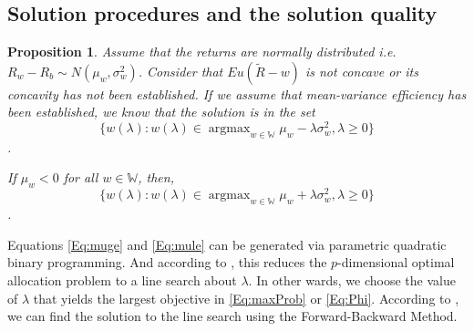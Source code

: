 \documentclass[12pt,oneside,a4paper]{book}
\newtheorem{prop+}           {Proposition}
\theoremstyle{definition}
\theoremstyle{remark}
\DeclareMathOperator*{\argmax}{argmax}
\begin{document}
			\subsection{Solution procedures and the solution quality} \label{sec:sol_to_mean_var}
				\begin{prop+}\cite{morton2003optimizing}
					Assume that the returns are normally distributed i.e. $R_w-R_b \sim N(\mu_w,\sigma_w^2)$. Consider that $Eu(\tilde{R}-w)$ is not concave or its concavity has not been established. If we assume that mean-variance efficiency has been established, we know that the solution is in the set
					\begin{equation}\label{Eq:muge}
						\{ w(\lambda):w(\lambda) \in \argmax_{w\in \mathbb{W}} \mu_w - \lambda\sigma_w^2, \lambda \ge0 \}
					\end{equation}.

					If $\mu_w <0$ for all $w\in \mathbb{W}$, then,
					\begin{equation}\label{Eq:mule}
						\{ w(\lambda):w(\lambda) \in \argmax_{w\in \mathbb{W}} \mu_w + \lambda\sigma_w^2, \lambda \ge0 \}
					\end{equation}.
				\end{prop+}

				Equations \eqref{Eq:muge} and \eqref{Eq:mule} can be generated via parametric quadratic binary programming. And according to \cite{morton2003optimizing}, this reduces the $p$-dimensional optimal allocation problem to a line search about $\lambda$. In other wards, we choose the value of $\lambda$ that yields the largest objective in \eqref{Eq:maxProb} or \eqref{Eq:Phi}. According to \cite{sun2006optimization}, we can find the solution to the line search using the Forward-Backward Method.
\end{document}

